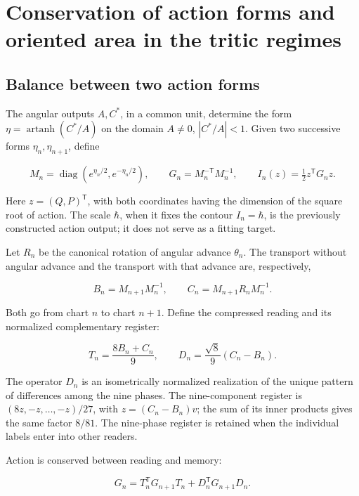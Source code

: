 \section{Conservation of action forms and oriented area in the tritic regimes}
\label{nuclear:8}
\subsection{Balance between two action forms}

The angular outputs \(A,C^*\), in a common unit, determine the form \(\eta=\operatorname{artanh}(C^*/A)\) on the domain \(A\ne0\), \(|C^*/A|<1\). Given two successive forms \(\eta_n,\eta_{n+1}\), define

\[
M_n=\operatorname{diag}(e^{\eta_n/2},e^{-\eta_n/2}),\qquad
G_n=M_n^{-\mathsf T}M_n^{-1},\qquad
I_n(z)=\tfrac12z^\mathsf TG_nz.
\]

Here \(z=(Q,P)^\mathsf T\), with both coordinates having the dimension of the square root of action. The scale \(\hbar\), when it fixes the contour \(I_n=\hbar\), is the previously constructed action output; it does not serve as a fitting target.

Let \(R_n\) be the canonical rotation of angular advance \(\theta_n\). The transport without angular advance and the transport with that advance are, respectively,

\begin{equation}
B_n=M_{n+1}M_n^{-1},\qquad
C_n=M_{n+1}R_nM_n^{-1}.
\label{nuc08:eq:1}
\end{equation}

Both go from chart \(n\) to chart \(n+1\). Define the compressed reading and its normalized complementary register:

\begin{equation}
T_n=\frac{8B_n+C_n}{9},\qquad
D_n=\frac{\sqrt8}{9}(C_n-B_n).
\label{nuc08:eq:2}
\end{equation}

The operator \(D_n\) is an isometrically normalized realization of the unique pattern of differences among the nine phases. The nine-component register is \((8z,-z,\ldots,-z)/27\), with \(z=(C_n-B_n)v\); the sum of its inner products gives the same factor \(8/81\). The nine-phase register is retained when the individual labels enter into other readers.

\begin{theorem}
Action is conserved between reading and memory:

\begin{equation}
\boxed{G_n=T_n^\mathsf TG_{n+1}T_n+D_n^\mathsf TG_{n+1}D_n.}
\label{nuc08:eq:3}
\end{equation}
\end{theorem}

